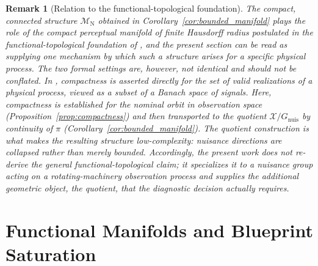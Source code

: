 \documentclass[a4paper]{cas-sc}
\newtheorem{remark}{Remark}
\newcommand{\Mnominal}{\ensuremath{\mathcal{M}_{\mathrm{N}}}}
\newcommand{\quotient}{\ensuremath{\mathcal{X}/G_{\mathrm{nuis}}}}
\begin{document}
\begin{remark}[Relation to the functional-topological foundation]
\label{rem:blueprints_relation}
The compact, connected structure \(\Mnominal\) obtained in
Corollary~\ref{cor:bounded_manifold} plays the role of the compact
perceptual manifold of finite Hausdorff radius postulated in the
functional-topological foundation of \citet{disanti2026blueprints}, and the
present section can be read as supplying one mechanism by which such a
structure arises for a specific physical process. The two formal settings
are, however, not identical and should not be conflated. In
\citet{disanti2026blueprints}, compactness is asserted directly for the set
of valid realizations of a physical process, viewed as a subset of a Banach
space of signals. Here, compactness is established for the nominal orbit in
observation space (Proposition~\ref{prop:compactness}) and then transported
to the \emph{quotient} \(\quotient\) by continuity of \(\pi\)
(Corollary~\ref{cor:bounded_manifold}). The quotient construction is what
makes the resulting structure low-complexity: nuisance directions are
collapsed rather than merely bounded. Accordingly, the present work does
not re-derive the general functional-topological claim; it specializes it to
a nuisance group acting on a rotating-machinery observation process and
supplies the additional geometric object, the quotient, that the diagnostic
decision actually requires.
\end{remark}

\section{Functional Manifolds and Blueprint Saturation}
\label{sec:manifolds_saturation}
%
\end{document}

